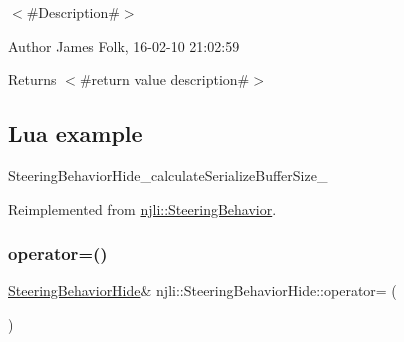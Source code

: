 $<$\#\+Description\#$>$ 

\begin{DoxyAuthor}{Author}
James Folk, 16-\/02-\/10 21\+:02\+:59
\end{DoxyAuthor}
\begin{DoxyReturn}{Returns}
$<$\#return value description\#$>$
\end{DoxyReturn}
\hypertarget{classnjli_1_1_steering_behavior_wander_ex1}{}\subsection{Lua example}\label{classnjli_1_1_steering_behavior_wander_ex1}

\begin{DoxyCodeInclude}
\end{DoxyCodeInclude}
Steering\+Behavior\+Hide\+\_\+calculate\+Serialize\+Buffer\+Size\+\_\+ 

Reimplemented from \mbox{\hyperlink{classnjli_1_1_steering_behavior_acd7af46e42a8a3fc1208a47f50836ac8}{njli\+::\+Steering\+Behavior}}.

\mbox{\label{classnjli_1_1_steering_behavior_hide_ab1411a1ed83c0ce426ce4a5933b3432a}} 
\subsubsection{\texorpdfstring{operator=()}{operator=()}}
{\footnotesize\ttfamily \mbox{\hyperlink{classnjli_1_1_steering_behavior_hide}{Steering\+Behavior\+Hide}}\& njli\+::\+Steering\+Behavior\+Hide\+::operator= (\begin{DoxyParamCaption}\item[{const \mbox{\hyperlink{classnjli_1_1_steering_behavior_hide}{Steering\+Behavior\+Hide}} \&}]{ }\end{DoxyParamCaption})\hspace{0.3cm}{\ttfamily [protected]}}

\mbox{\label{classnjli_1_1_steering_behavior_hide_a6846cae09de6f06b52cc97a7ff0467f8}} 
